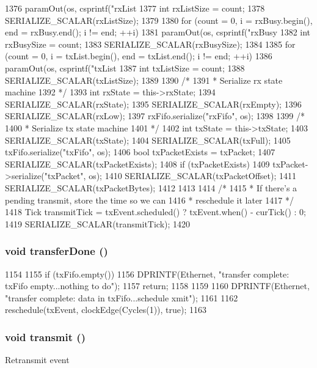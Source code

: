 \begin{DoxyCode}
{1376         paramOut(os, csprintf("rxList%
1377     int rxListSize = count;
1378     SERIALIZE_SCALAR(rxListSize);
1379 
1380     for (count = 0, i = rxBusy.begin(), end = rxBusy.end(); i != end; ++i)
1381         paramOut(os, csprintf("rxBusy%
1382     int rxBusySize = count;
1383     SERIALIZE_SCALAR(rxBusySize);
1384 
1385     for (count = 0, i = txList.begin(), end = txList.end(); i != end; ++i)
1386         paramOut(os, csprintf("txList%
1387     int txListSize = count;
1388     SERIALIZE_SCALAR(txListSize);
1389 
1390     /*
1391      * Serialize rx state machine
1392      */
1393     int rxState = this->rxState;
1394     SERIALIZE_SCALAR(rxState);
1395     SERIALIZE_SCALAR(rxEmpty);
1396     SERIALIZE_SCALAR(rxLow);
1397     rxFifo.serialize("rxFifo", os);
1398 
1399     /*
1400      * Serialize tx state machine
1401      */
1402     int txState = this->txState;
1403     SERIALIZE_SCALAR(txState);
1404     SERIALIZE_SCALAR(txFull);
1405     txFifo.serialize("txFifo", os);
1406     bool txPacketExists = txPacket;
1407     SERIALIZE_SCALAR(txPacketExists);
1408     if (txPacketExists) {
1409         txPacket->serialize("txPacket", os);
1410         SERIALIZE_SCALAR(txPacketOffset);
1411         SERIALIZE_SCALAR(txPacketBytes);
1412     }
1413 
1414     /*
1415      * If there's a pending transmit, store the time so we can
1416      * reschedule it later
1417      */
1418     Tick transmitTick = txEvent.scheduled() ? txEvent.when() - curTick() : 0;
1419     SERIALIZE_SCALAR(transmitTick);
1420 }
\end{DoxyCode}
\hypertarget{classSinic_1_1Device_ac47b2c25cccfafe7e2c12673a1b3e793}{
\subsubsection[{transferDone}]{\setlength{\rightskip}{0pt plus 5cm}void transferDone ()}}
\label{classSinic_1_1Device_ac47b2c25cccfafe7e2c12673a1b3e793}



\begin{DoxyCode}
1154 {
1155     if (txFifo.empty()) {
1156         DPRINTF(Ethernet, "transfer complete: txFifo empty...nothing to do\n");
1157         return;
1158     }
1159 
1160     DPRINTF(Ethernet, "transfer complete: data in txFifo...schedule xmit\n");
1161 
1162     reschedule(txEvent, clockEdge(Cycles(1)), true);
1163 }
\end{DoxyCode}
\hypertarget{classSinic_1_1Device_af04463ca216d10ffa94db8463cee04c9}{
\subsubsection[{transmit}]{\setlength{\rightskip}{0pt plus 5cm}void transmit ()}}
\label{classSinic_1_1Device_af04463ca216d10ffa94db8463cee04c9}
Retransmit event 


